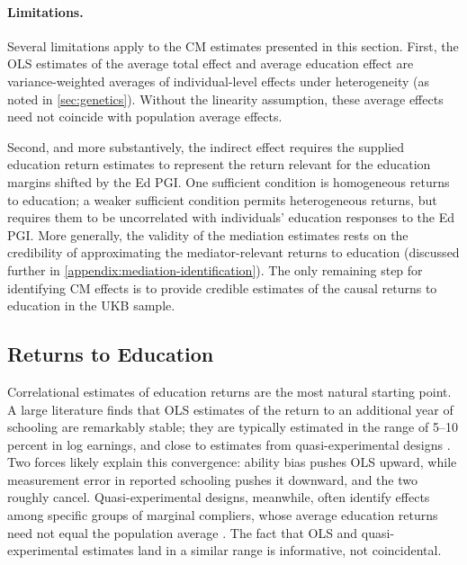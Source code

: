 \paragraph{Limitations.}
Several limitations apply to the CM estimates presented in this section.
First, the OLS estimates of the average total effect and average education effect are variance-weighted averages of individual-level effects under heterogeneity (as noted in \autoref{sec:genetics}).
Without the linearity assumption, these average effects need not coincide with population average effects.

Second, and more substantively, the indirect effect requires the supplied education return estimates to represent the return relevant for the education margins shifted by the Ed PGI.
One sufficient condition is homogeneous returns to education; a weaker sufficient condition permits heterogeneous returns, but requires them to be uncorrelated with individuals' education responses to the Ed PGI.
More generally, the validity of the mediation estimates rests on the credibility of approximating the mediator-relevant returns to education (discussed further in \autoref{appendix:mediation-identification}).
The only remaining step for identifying CM effects is to provide credible estimates of the causal returns to education in the UKB sample.

\subsection{Returns to Education}
Correlational estimates of education returns are the most natural starting point.
A large literature finds that OLS estimates of the return to an additional year of schooling are remarkably stable; they are typically estimated in the range of 5--10 percent in log earnings, and close to estimates from quasi-experimental designs \citep{angrist1991does, harmon1995estimates, oreopoulos2006estimating}.
Two forces likely explain this convergence: ability bias pushes OLS upward, while measurement error in reported schooling pushes it downward, and the two roughly cancel. Quasi-experimental designs, meanwhile, often identify effects among specific groups of marginal compliers, whose average education returns need not equal the population average \citep{buscha2015wage}.
The fact that OLS and quasi-experimental estimates land in a similar range is informative, not coincidental.

